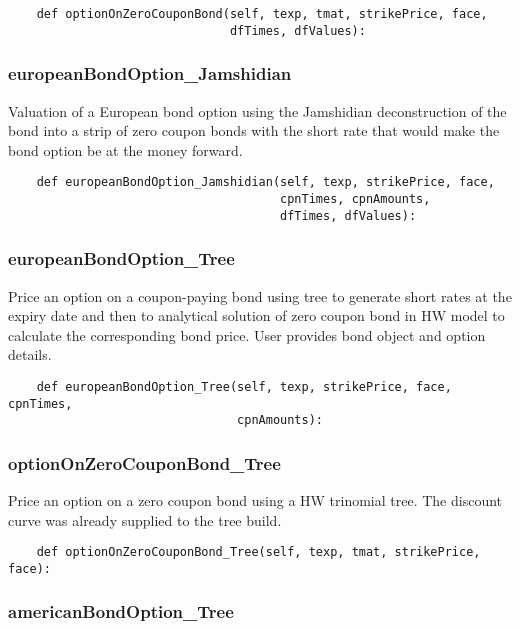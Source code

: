 \documentclass[twoside,11pt]{book}
\begin{document}
\begin{lstlisting}
    def optionOnZeroCouponBond(self, texp, tmat, strikePrice, face,
                               dfTimes, dfValues):
\end{lstlisting}

\subsubsection*{{\bf europeanBondOption\_Jamshidian}}
Valuation of a European bond option using the Jamshidian deconstruction of the bond into a strip of zero coupon bonds with the short rate that would make the bond option be at the money forward.  

\begin{lstlisting}
    def europeanBondOption_Jamshidian(self, texp, strikePrice, face,
                                      cpnTimes, cpnAmounts,
                                      dfTimes, dfValues):
\end{lstlisting}

\subsubsection*{{\bf europeanBondOption\_Tree}}
Price an option on a coupon-paying bond using tree to generate short rates at the expiry date and then to analytical solution of zero coupon bond in HW model to calculate the corresponding bond price. User provides bond object and option details.  

\begin{lstlisting}
    def europeanBondOption_Tree(self, texp, strikePrice, face, cpnTimes,
                                cpnAmounts):
\end{lstlisting}

\subsubsection*{{\bf optionOnZeroCouponBond\_Tree}}
Price an option on a zero coupon bond using a HW trinomial tree. The discount curve was already supplied to the tree build.  

\begin{lstlisting}
    def optionOnZeroCouponBond_Tree(self, texp, tmat, strikePrice, face):
\end{lstlisting}

\subsubsection*{{\bf americanBondOption\_Tree}}
\end{document}

